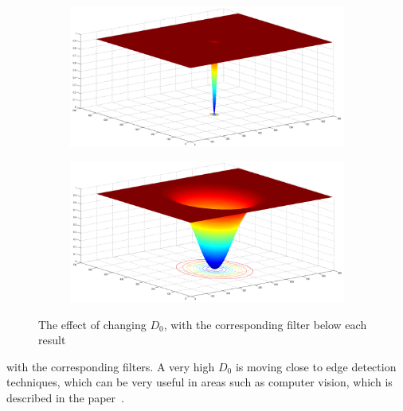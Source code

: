 \begin{figure}[h!]
\begin{subfigure}[b]{0.5\linewidth}
				\label{fig:high_sigma}
			\end{subfigure}
			\label{fig:sigma}
			\begin{subfigure}[b]{0.5\linewidth}
				\includegraphics[width=0.9\linewidth]{pics/low_sigma_filter.png}
				\caption{}
				\label{fig:low_sigma_filter}
			\end{subfigure}%
			\begin{subfigure}[b]{0.5\linewidth}
				\includegraphics[width=0.9\linewidth]{pics/high_sigma_filter.png}
				\caption{}
				\label{fig:high_sigma_filter}
			\end{subfigure}
		\caption{The effect of changing $D_0$, with the corresponding filter below each result}				
		\label{fig:sigma}
		\end{figure}
		with the corresponding filters. A very high $D_0$ is moving close to edge detection
		techniques,
		which can be very useful in areas such as computer vision, which is described in 
		the paper~\cite{Fan20111468}.\\
